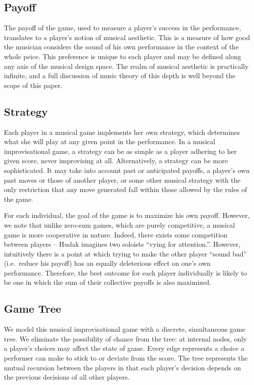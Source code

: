 \documentclass{article}
\begin{document}
\subsection{Payoff}
The payoff of the game, used to measure a player's success in the
performance, translates to a player's notion of musical aesthetic. This
is a measure of how good the musician considers the sound of his own
performance in the context of the whole peice. This preference is
unique to each player and may be defined along any axis of the musical
design space. The realm of musical aesthetic is practically infinite,
and a full discussion of music theory of this depth is well beyond the
scope of this paper.

\subsection{Strategy}
Each player in a musical game implements her own strategy, which
determines what she will play at any given point in the performance. In
a musical improvisational game, a strategy can be as simple as a player
adhering to her given score, never improvising at all.
Alternatively, a strategy can be more sophisticated.  It may take into account
past or anticipated payoffs, a player's own past moves or those of
another player, or some other musical strategy with the only restriction
that any move generated fall within those allowed by the
rules of the game.

For each individual, the goal of the game is to maximize his own
payoff. However, we note that unlike zero-sum games, which are purely
competitive, a musical game is more cooperative in nature. Indeed, there
exists some competition between players -- Hudak imagines two soloists
``vying for attention.''. However, intuitively there is a point at which
trying to make the other player ``sound bad'' (i.e.~reduce his payoff)
has an equally deleterious effect on one's own performance. Therefore,
the best outcome for each player individually is likely to be one in
which the sum of their collective payoffs is also maximized.

\subsection{Game Tree}
We model this musical improvisational game with a discrete, simultaneous
game tree. We eliminate the possibility of chance from the tree: at
internal nodes, only a player's choices may affect the state of game.
Every edge represents a choice a performer can make to stick to or
deviate from the score. The tree represents the mutual recursion between
the players in that each player's decision depends on the previous
decisions of all other players.
\end{document}
